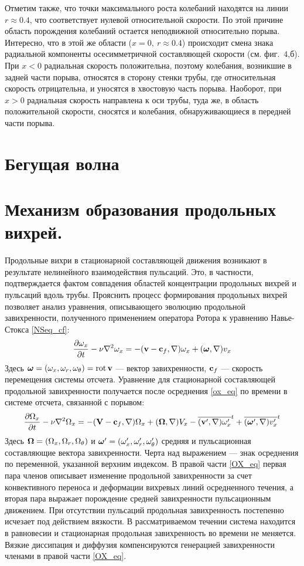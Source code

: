 Отметим также, что точки максимального роста колебаний находятся на линии $r\approx0.4$, что соответствует нулевой относительной скорости. По этой причине область порождения колебаний остается неподвижной относительно порыва. Интересно, что в этой же области ($x=0,\ r\approx0.4$) происходит смена знака радиальной компоненты осесимметричной составляющей скорости (см. фиг.~4,б). При $x<0$ радиальная скорость положительна, поэтому колебания, возникшие в задней части порыва, относятся в сторону стенки трубы, где относительная скорость отрицательна, и уносятся в хвостовую часть порыва. Наоборот, при $x>0$ радиальная скорость направлена к оси трубы, туда же, в область положительной скорости, сносятся и колебания, обнаруживающиеся в передней части порыва.


\section{Бегущая волна}


\section{Механизм образования продольных вихрей.}

Продольные вихри в стационарной составляющей движения возникают в результате нелинейного взаимодействия пульсаций. Это, в частности, подтверждается фактом совпадения областей концентрации продольных вихрей и пульсаций вдоль трубы. Прояснить процесс формирования продольных вихрей позволяет анализ уравнения, описывающего эволюцию продольной завихренности, полученного применением оператора Ротора к уравнению Навье-Стокса \eqref{NSeq_cf}:
\begin{equation}\label{ox_eq}
\frac{\partial \omega_x}{\partial t} - \nu\nabla^2 \omega_x =  -  (\mathbf{v} - \mathbf{c}_f, \nabla) \omega_x + (\mbox{\boldmath$\omega$}, \nabla) v_x
\end{equation}
Здесь $\mbox{\boldmath$\omega$} = (\omega_x, \omega_r, \omega_\theta) = \operatorname{rot} \mathbf{v}$ --- вектор завихренности, $\mathbf{c}_f$ --- скорость перемещения системы отсчета. Уравнение для стационарной составляющей продольной завихренности получается после осреднения \eqref{ox_eq} по времени в системе отсчета, связанной с порывом:
\begin{equation}\label{OX_eq}
\frac{\partial \Omega_x}{\partial t} - \nu\nabla^2 \Omega_x = - (\mathbf{V} - \mathbf{c}_f, \nabla) \Omega_x + (\mbox{\boldmath$\Omega$}, \nabla) V_x - \overline{(\mathbf{v}', \nabla) \omega'_x}^t + \overline{ (\mbox{\boldmath$\omega$}', \nabla) v'_x }^t
\end{equation}
Здесь  $\mbox{\boldmath$\Omega$}=(\Omega_x, \Omega_r, \Omega_\theta)$ и $\mbox{\boldmath$\omega$}'=(\omega'_x, \omega'_r, \omega'_\theta)$ средняя и пульсационная составляющие вектора завихренности. Черта над выражением --- знак осреднения по переменной, указанной верхним индексом. В правой части \eqref{OX_eq} первая пара членов описывает изменение продольной завихренности за счет конвективного переноса и деформации вихревых линий осредненного течения, а вторая пара выражает порождение средней завихренности пульсационным движением. При отсутствии пульсаций продольная завихренность постепенно исчезает под действием вязкости. В рассматриваемом течении система находится в равновесии и стационарная продольная завихренность во времени не меняется. Вязкие диссипация и диффузия компенсируются генерацией завихренности членами в правой части \eqref{OX_eq}.

